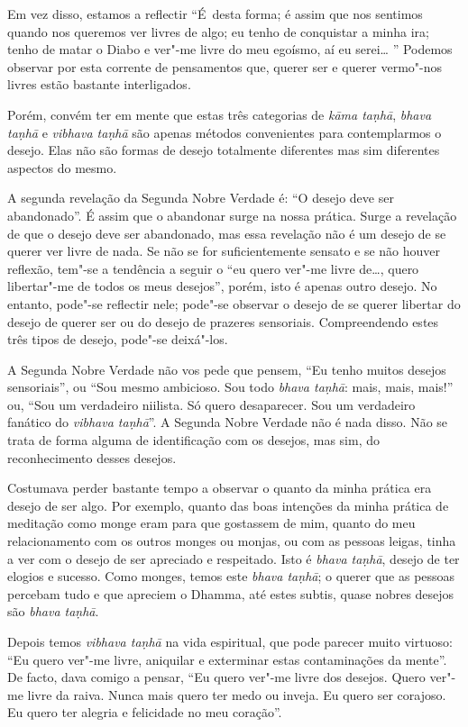 Em vez disso, estamos a reflectir “É~desta forma; é assim
que nos sentimos quando nos queremos ver livres de algo; eu tenho de conquistar
a minha ira; tenho de matar o Diabo e ver"-me livre do meu egoísmo, aí eu
serei\ldots{} ” Podemos observar por esta corrente de pensamentos que, querer ser e
querer vermo"-nos livres estão bastante interligados.

Porém, convém ter em mente que estas três categorias de \emph{kāma taṇhā},
\emph{bhava taṇhā} e \emph{vibhava taṇhā} são apenas métodos convenientes para
contemplarmos o desejo. Elas não são formas de desejo totalmente diferentes mas
sim diferentes aspectos do mesmo.

A segunda revelação da Segunda Nobre Verdade é: “O desejo deve ser abandonado”.
É assim que o abandonar surge na nossa prática. Surge a revelação de que o
desejo deve ser abandonado, mas essa revelação não é um desejo de se querer ver
livre de nada. Se não se for suficientemente sensato e se não houver reflexão,
tem"-se a tendência a seguir o “eu quero ver"-me livre de\ldots{}, quero
libertar"-me de todos os meus desejos”, porém, isto é apenas outro desejo. No
entanto, pode"-se reflectir nele; pode"-se observar o desejo de se querer libertar
do desejo de querer ser ou do desejo de prazeres sensoriais. Compreendendo estes
três tipos de desejo, pode"-se deixá"-los.

A Segunda Nobre Verdade não vos pede que pensem, “Eu tenho muitos desejos
sensoriais”, ou “Sou mesmo ambicioso. Sou todo \emph{bhava taṇhā}: mais, mais,
mais!” ou, “Sou um verdadeiro niilista. Só quero desaparecer. Sou um verdadeiro
fanático do \emph{vibhava taṇhā}”. A Segunda Nobre Verdade não é nada disso. Não
se trata de forma alguma de identificação com os desejos, mas sim, do
reconhecimento desses desejos.

Costumava perder bastante tempo a observar o quanto da minha prática era desejo
de ser algo. Por exemplo, quanto das boas intenções da minha prática de
meditação como monge eram para que gostassem de mim, quanto do meu
relacionamento com os outros monges ou monjas, ou com as pessoas leigas, tinha a
ver com o desejo de ser apreciado e respeitado. Isto é \emph{bhava taṇhā},
desejo de ter elogios e sucesso. Como monges, temos este \emph{bhava taṇhā}; o
querer que as pessoas percebam tudo e que apreciem o Dhamma, até estes subtis,
quase nobres desejos são \emph{bhava taṇhā}.

Depois temos \emph{vibhava taṇhā} na vida espiritual, que pode parecer muito
virtuoso: “Eu quero ver"-me livre, aniquilar e exterminar estas contaminações da
mente”. De facto, dava comigo a pensar, “Eu quero ver"-me livre dos desejos.
Quero ver"-me livre da raiva. Nunca mais quero ter medo ou inveja. Eu quero ser
corajoso. Eu quero ter alegria e felicidade no meu coração”.

